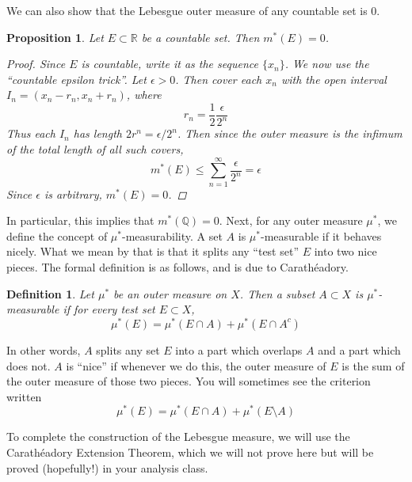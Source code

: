 \documentclass[12pt]{amsart}         %
\newtheorem{definition}{Definition}[section]
\newtheorem{proposition}{Proposition}[section]
\theoremstyle{remark}
\newcommand{\R}{\mathbb{R}}
\newcommand{\Q}{\mathbb{Q}}
\begin{document}
We can also show that the Lebesgue outer measure of any countable set is 0.

\begin{proposition}
Let $E \subset \R$ be a countable set. Then $m^*(E) = 0$.
\begin{proof}
Since $E$ is countable, write it as the sequence $\{x_n\}$. We now use the ``countable epsilon trick''. Let $\epsilon > 0$. Then cover each $x_n$ with the open interval $I_n = (x_n - r_n, x_n + r_n)$, where
\[
r_n = \frac{1}{2} \frac{\epsilon}{2^n}
\]
Thus each $I_n$ has length $2 r^n = \epsilon/2^n$. Then since the outer measure is the infimum of the total length of all such covers,
\[
m^*(E) \leq \sum_{n=1}^{\infty} \frac{\epsilon}{2^n} = \epsilon
\]
Since $\epsilon$ is arbitrary, $m^*(E) = 0$.
\end{proof}
\end{proposition}

In particular, this implies that $m^*(\Q) = 0$. Next, for any outer measure $\mu^*$, we define the concept of $\mu^*$-measurability. A set $A$ is $\mu^*$-measurable if it behaves nicely. What we mean by that is that it splits any ``test set'' $E$ into two nice pieces. The formal definition is as follows, and is due to Carath\'{e}adory.

\begin{definition}
Let $\mu^*$ be an outer measure on $X$. Then a subset $A \subset X$ is \emph{$\mu^*$-measurable} if for every test set $E \subset X$,
\[
\mu^*(E) = \mu^*(E \cap A) + \mu^*(E \cap A^c)
\]
\end{definition}
In other words, $A$ splits any set $E$ into a part which overlaps $A$ and a part which does not. $A$ is ``nice'' if whenever we do this, the outer measure of $E$ is the sum of the outer measure of those two pieces. You will sometimes see the criterion written
\[
\mu^*(E) = \mu^*(E \cap A) + \mu^*(E \setminus A)
\]

To complete the construction of the Lebesgue measure, we will use the Carath\'{e}adory Extension Theorem, which we will not prove here but will be proved (hopefully!) in your analysis class.
\end{document}
